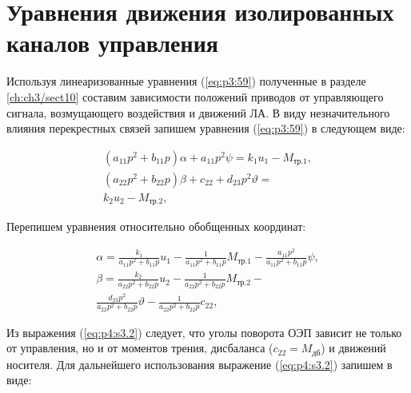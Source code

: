 \section{Уравнения движения изолированных каналов управления} \label{ch:ch4/sect3}

Используя линеаризованные уравнения (\ref{eq:p3:59}) полученные в разделе \ref{ch:ch3/sect10} составим зависимости положений приводов от управляющего сигнала, возмущающего воздействия и движений ЛА. В виду незначительного влияния перекрестных связей запишем уравнения (\ref{eq:p3:59}) в следующем виде:

\begin{equation}
\label{eq:p4:s3.1}
\begin{multlined}
\left( a_{11}p^{2}+b_{11}p \right)  \alpha + 
a_{11} p^2  \psi 
=
k_{1}  u_{1}- 
 M_{\textit{тр.1}},\\
\left( a_{22}p^{2}+b_{22}p \right)  \beta + c_{22}+
d_{23} p^2  \vartheta
=\\
k_{2}  u_{2} - M_{\textit{тр.2}},
\end{multlined}
\end{equation}

Перепишем уравнения относительно обобщенных координат:

\begin{equation}
\label{eq:p4:s3.2}
\begin{multlined}
\alpha= 
\frac{k_{1}}{a_{11}p^{2}+b_{11}p} u_{1} - 
\frac{1}{a_{11}p^{2}+b_{11}p} M_{\textit{тр.1}} - 
\frac{a_{11} p^2}{a_{11}p^{2}+b_{11}p}  \psi  ,\\
\beta=
\frac{k_{2}}{a_{22}p^{2}+b_{22}p} u_{2} - 
\frac{1}{a_{22}p^{2}+b_{22}p} M_{\textit{тр.2}} - \\
\frac{d_{23} p^2}{a_{22}p^{2}+b_{22}p} \vartheta -
\frac{1}{a_{22}p^{2}+b_{22}p} c_{22},
\end{multlined}
\end{equation}

Из выражения (\ref{eq:p4:s3.2}) следует, что уголы поворота ОЭП зависит не только от управления, но и от моментов трения, дисбаланса ($c_{22}=M_{\textit{дб}}$) и движений носителя. Для дальнейшего использования выражение (\ref{eq:p4:s3.2}) запишем в виде:

